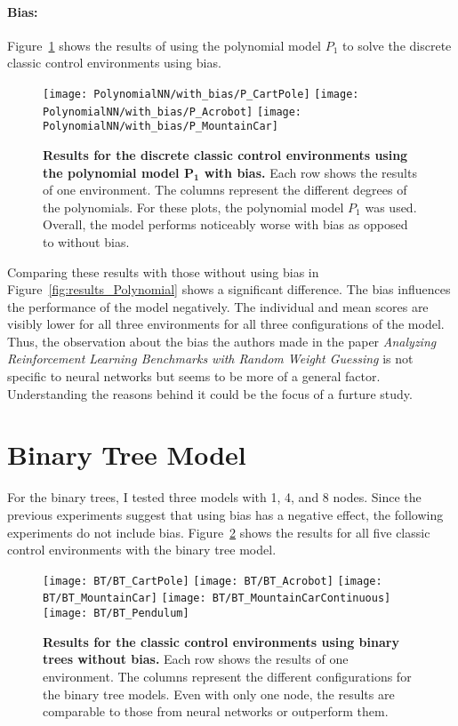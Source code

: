 \paragraph*{Bias:} Figure~\ref{fig:results_Polynomial_bias} shows the results of using the polynomial model $P_1$ to solve the discrete classic control environments using bias.
\begin{figure}[!ht]
  \centering
  \texttt{[image: PolynomialNN/with\_bias/P\_CartPole]}
  \texttt{[image: PolynomialNN/with\_bias/P\_Acrobot]}
  \texttt{[image: PolynomialNN/with\_bias/P\_MountainCar]}
\caption[Results for the discrete classic control environments using the polynomial model $\mathbf{P_1}$ with bias]{
  \textbf{Results for the discrete classic control environments using the polynomial model $\mathbf{P_1}$ with bias.}
   Each row shows the results of one environment. The columns represent the different degrees of the polynomials. For these plots, the polynomial model $P_1$ was used. Overall, the model performs noticeably worse with bias as opposed to without bias.
}
\label{fig:results_Polynomial_bias}
\end{figure}
Comparing these results with those without using bias in Figure~\ref{fig:results_Polynomial} shows a significant difference. The bias influences the performance of the model negatively. The individual and mean scores are visibly lower for all three environments for all three configurations of the model. Thus, the observation about the bias the authors made in the paper \emph{Analyzing Reinforcement Learning Benchmarks with Random Weight Guessing} is not specific to neural networks but seems to be more of a general factor. Understanding the reasons behind it could be the focus of a furture study.

\section{Binary Tree Model}
For the binary trees, I tested three models with 1, 4, and 8 nodes. Since the previous experiments suggest that using bias has a negative effect, the following experiments do not include bias. Figure~\ref{fig:results_BinaryTree} shows the results for all five classic control environments with the binary tree model.
\begin{figure}[!ht]
  \centering
  \texttt{[image: BT/BT\_CartPole]}
  \texttt{[image: BT/BT\_Acrobot]}
  \texttt{[image: BT/BT\_MountainCar]}
  \texttt{[image: BT/BT\_MountainCarContinuous]}
  \texttt{[image: BT/BT\_Pendulum]}
\caption[Results for the classic control environments using binary trees without bias]{
  \textbf{Results for the classic control environments using binary trees without bias.}
   Each row shows the results of one environment. The columns represent the different configurations for the binary tree models. Even with only one node, the results are comparable to those from neural networks or outperform them.
}
\label{fig:results_BinaryTree}
\end{figure}

